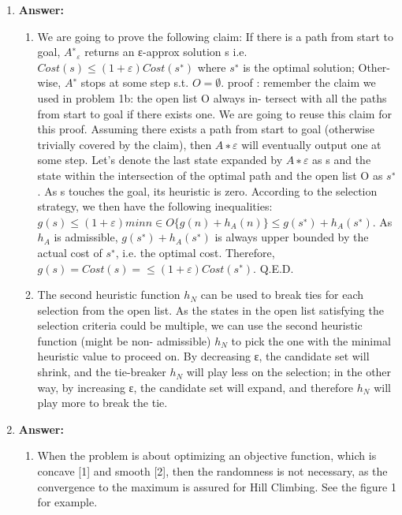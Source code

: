\documentclass[12pt]{article}
\begin{document}
\begin{enumerate}
\begin{enumerate}
    
\end{enumerate}

\item

\textbf{Answer:}

\begin{enumerate}
    \item We are going to prove the following claim:
If there is a path from start to goal, ${A^∗}_ε$ returns an ε-approx solution s i.e. $Cost(s) \leq (1 + ε)Cost(s^∗)$ where $s^∗$ is the optimal solution; Other- wise, $A^∗$ stops at some step s.t. $O = ∅$.
proof : remember the claim we used in problem 1b: the open list O always in- tersect with all the paths from start to goal if there exists one. We are going to reuse this claim for this proof. Assuming there exists a path from start to goal (otherwise trivially covered by the claim), then $A∗ε$ will eventually output one at some step. Let’s denote the last state expanded by $A∗ε$ as s and the state within the intersection of the optimal path and the open list O as $s^∗$. As s touches the goal, its heuristic is zero. According to the selection strategy, we then have the following inequalities: $g(s) \leq (1 + ε)minn∈O\{g(n) + h_A(n)\} \leq g(s^∗) + h_A(s^∗)$. As $h_A$ is admissible, $g(s^∗) + h_A(s^∗)$ is always upper bounded by the actual cost of $s^∗$, i.e. the optimal cost. Therefore, $g(s) = Cost(s) = \leq (1 + ε)Cost(s^∗)$. Q.E.D.
    
    \item The second heuristic function $h_N$ can be used to break ties for each selection from the open list. As the states in the open list satisfying the selection criteria could be multiple, we can use the second heuristic function (might be non- admissible) $h_N$ to pick the one with the minimal heuristic value to proceed on. By decreasing ε, the candidate set will shrink, and the tie-breaker $h_N$ will play less on the selection; in the other way, by increasing ε, the candidate set will expand, and therefore $h_N$ will play more to break the tie.


\end{enumerate}

\item


\textbf{Answer:}

\begin{enumerate}
    \item When the problem is about optimizing an objective function, which is concave [1] and smooth [2], then the randomness is not necessary, as the convergence to the maximum is assured for Hill Climbing. See the figure 1 for example.
    

\end{enumerate}
\end{enumerate}
\end{document}
